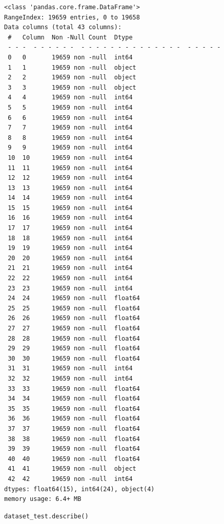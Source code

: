 \begin{verbatim}
<class 'pandas.core.frame.DataFrame'>
RangeIndex: 19659 entries, 0 to 19658
Data columns (total 43 columns):
 #   Column  Non -Null Count  Dtype  
 - - -  - - - - - -  - - - - - - - - - - - - - -  - - - - -  
 0   0       19659 non -null  int64  
 1   1       19659 non -null  object 
 2   2       19659 non -null  object 
 3   3       19659 non -null  object 
 4   4       19659 non -null  int64  
 5   5       19659 non -null  int64  
 6   6       19659 non -null  int64  
 7   7       19659 non -null  int64  
 8   8       19659 non -null  int64  
 9   9       19659 non -null  int64  
 10  10      19659 non -null  int64  
 11  11      19659 non -null  int64  
 12  12      19659 non -null  int64  
 13  13      19659 non -null  int64  
 14  14      19659 non -null  int64  
 15  15      19659 non -null  int64  
 16  16      19659 non -null  int64  
 17  17      19659 non -null  int64  
 18  18      19659 non -null  int64  
 19  19      19659 non -null  int64  
 20  20      19659 non -null  int64  
 21  21      19659 non -null  int64  
 22  22      19659 non -null  int64  
 23  23      19659 non -null  int64  
 24  24      19659 non -null  float64
 25  25      19659 non -null  float64
 26  26      19659 non -null  float64
 27  27      19659 non -null  float64
 28  28      19659 non -null  float64
 29  29      19659 non -null  float64
 30  30      19659 non -null  float64
 31  31      19659 non -null  int64  
 32  32      19659 non -null  int64  
 33  33      19659 non -null  float64
 34  34      19659 non -null  float64
 35  35      19659 non -null  float64
 36  36      19659 non -null  float64
 37  37      19659 non -null  float64
 38  38      19659 non -null  float64
 39  39      19659 non -null  float64
 40  40      19659 non -null  float64
 41  41      19659 non -null  object 
 42  42      19659 non -null  int64  
dtypes: float64(15), int64(24), object(4)
memory usage: 6.4+ MB
\end{verbatim}

\begin{verbatim}
dataset_test.describe()
\end{verbatim}

